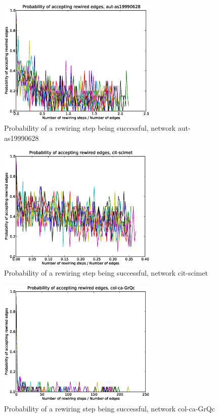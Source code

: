 \begin{figure}[p]
\centering
\includegraphics[width=3in]{Figures/Paccept-aut-as19990628.eps}
\caption{Probability of a rewiring step being successful, network aut-as19990628}
\label{fig:Paccept-aut-as19990628}
\end{figure}

\begin{figure}[p]
\centering
\includegraphics[width=3in]{Figures/Paccept-cit-scimet.eps}
\caption{Probability of a rewiring step being successful, network cit-scimet}
\label{fig:Paccept-cit-scimet}
\end{figure}

\begin{figure}[p]
\centering
\includegraphics[width=3in]{Figures/Paccept-col-ca-GrQc.eps}
\caption{Probability of a rewiring step being successful, network col-ca-GrQc}
\label{fig:Paccept-col-ca-GrQc}
\end{figure}

